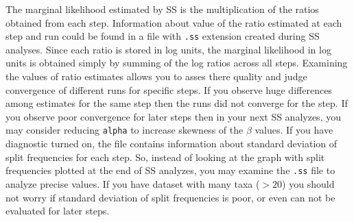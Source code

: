 \documentclass[12pt]{book}
\begin{document}
The marginal likelihood estimated by SS is the multiplication of the ratios obtained from each
step. Information about value of the ratio estimated at each step and run could be found in a file
with \texttt{.ss} extension created during SS analyses. Since each ratio is stored in log units,
the marginal likelihood in log units is obtained simply by summing of the log ratios across all
steps.  Examining the values of ratio estimates allows you to asses there quality and judge
convergence of different runs for specific steps. If you observe huge differences among estimates
for the same step then the runs did not converge for the step. If you observe poor convergence for
later steps then in your next SS analyzes, you may consider reducing \texttt{alpha} to increase
skewness of the $\beta$ values. If you have diagnostic turned on, the file contains information
about standard deviation of split frequencies for each step. So, instead of looking at the graph
with split frequencies plotted at the end of SS analyzes, you may examine the \texttt{.ss} file to
analyze precise values. If you have dataset with many taxa ($>20$) you should not worry if standard
deviation of split frequencies is poor, or even can not be evaluated for later steps.

\end{document}

